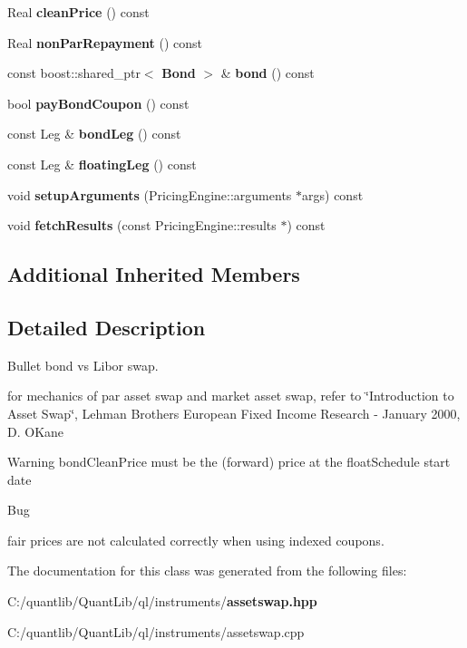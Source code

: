 \begin{DoxyCompactItemize}
\item 
Real {\bfseries clean\+Price} () const \label{class_quant_lib_1_1_asset_swap_a91e266b4c1dc91a19c4b3c519fc010bd}

\item 
Real {\bfseries non\+Par\+Repayment} () const \label{class_quant_lib_1_1_asset_swap_abb43c4137798f352379691c8d6275291}

\item 
const boost\+::shared\+\_\+ptr$<$ {\bf Bond} $>$ \& {\bfseries bond} () const \label{class_quant_lib_1_1_asset_swap_a70c8fb07fc50daa41c2e8b2ea704feee}

\item 
bool {\bfseries pay\+Bond\+Coupon} () const \label{class_quant_lib_1_1_asset_swap_a4f772f3a4ed8900675e26ab212c9a6ad}

\item 
const Leg \& {\bfseries bond\+Leg} () const \label{class_quant_lib_1_1_asset_swap_a7dc3bf3fcf0130a70f57a443cd44f42c}

\item 
const Leg \& {\bfseries floating\+Leg} () const \label{class_quant_lib_1_1_asset_swap_a940b7b6579e8974d1ccf027bee3692ee}

\item 
void {\bfseries setup\+Arguments} (Pricing\+Engine\+::arguments $\ast$args) const \label{class_quant_lib_1_1_asset_swap_ac235eea96276baa2ae5a8a7f36e4f123}

\item 
void {\bfseries fetch\+Results} (const Pricing\+Engine\+::results $\ast$) const \label{class_quant_lib_1_1_asset_swap_a16b324563efbbe1419644b475fc49135}

\end{DoxyCompactItemize}
\subsection*{Additional Inherited Members}


\subsection{Detailed Description}
Bullet bond vs Libor swap. 

for mechanics of par asset swap and market asset swap, refer to \char`\"{}\+Introduction to Asset Swap\char`\"{}, Lehman Brothers European Fixed Income Research -\/ January 2000, D. O\textquotesingle{}Kane

\begin{DoxyWarning}{Warning}
bond\+Clean\+Price must be the (forward) price at the float\+Schedule start date
\end{DoxyWarning}
\begin{DoxyRefDesc}{Bug}
\item[{\bf Bug}]fair prices are not calculated correctly when using indexed coupons. \end{DoxyRefDesc}


The documentation for this class was generated from the following files\+:\begin{DoxyCompactItemize}
\item 
C\+:/quantlib/\+Quant\+Lib/ql/instruments/{\bf assetswap.\+hpp}\item 
C\+:/quantlib/\+Quant\+Lib/ql/instruments/assetswap.\+cpp\end{DoxyCompactItemize}
